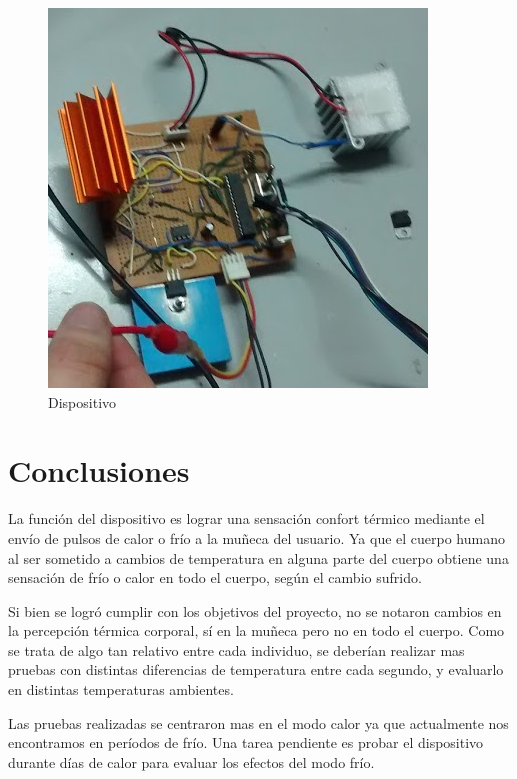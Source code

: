 \documentclass[10pt,spanish,a4paper,openany,notitlepage]{article}
\begin{document}
\begin{figure}[H] %
\begin{center}
\includegraphics[scale=0.65]{imagenes/dispositivo.png}
\caption{Dispositivo}
 \label{fig:dispositivo}
\end{center}
\end{figure}

\section{Conclusiones}

La función del dispositivo es lograr una sensación confort térmico mediante
el envío de pulsos de calor o frío a la muñeca del usuario. Ya que
el cuerpo humano al ser sometido a cambios de temperatura en
alguna parte del cuerpo obtiene una sensación de frío o calor en todo el cuerpo, según el
cambio sufrido.

Si bien se logró cumplir con los objetivos del proyecto, no se notaron
cambios en la percepción térmica corporal, sí en la muñeca pero no en todo el cuerpo. 
Como se trata de algo tan relativo entre cada individuo, se deberían realizar 
mas pruebas con distintas diferencias de temperatura entre cada segundo, y evaluarlo
en distintas temperaturas ambientes.

Las pruebas realizadas se centraron mas en el modo calor ya que actualmente
nos encontramos en períodos de frío. Una tarea pendiente es probar el dispositivo
durante días de calor para evaluar los efectos del modo frío.
\end{document}
